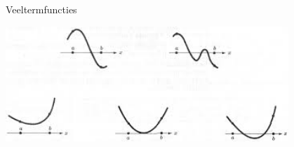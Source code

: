 \documentclass[12pt]{article}
\begin{document}
\thispagestyle{empty}
\begin{center}
  \begin{mdframed}
  \centering
  \fontsize{35}{70}\selectfont Veeltermfuncties
  \end{mdframed}
  \vfill
  \includegraphics[width=0.8\textwidth]{veeltermen}
  \vfill
\end{center}
\vspace*{-2cm}
\end{document}
